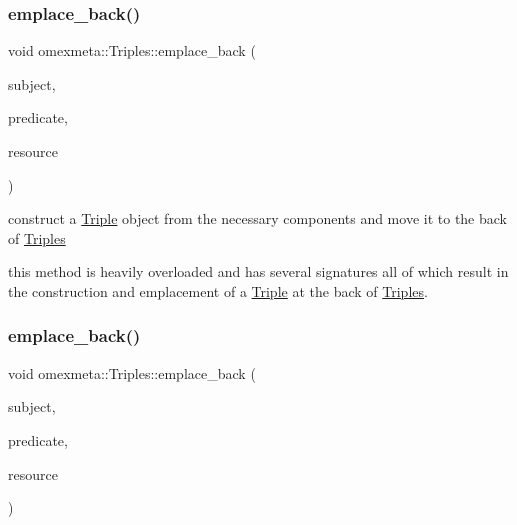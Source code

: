 \subsubsection{\texorpdfstring{emplace\+\_\+back()}{emplace\_back()}\hspace{0.1cm}{\footnotesize\ttfamily [4/7]}}
{\footnotesize\ttfamily void omexmeta\+::\+Triples\+::emplace\+\_\+back (\begin{DoxyParamCaption}\item[{\hyperlink{classomexmeta_1_1Subject}{Subject}}]{subject,  }\item[{\hyperlink{classomexmeta_1_1BiomodelsModelQualifier}{Biomodels\+Model\+Qualifier}}]{predicate,  }\item[{const \hyperlink{classomexmeta_1_1Resource}{Resource} \&}]{resource }\end{DoxyParamCaption})}



construct a \hyperlink{classomexmeta_1_1Triple}{Triple} object from the necessary components and move it to the back of \hyperlink{classomexmeta_1_1Triples}{Triples} 

this method is heavily overloaded and has several signatures all of which result in the construction and emplacement of a \hyperlink{classomexmeta_1_1Triple}{Triple} at the back of \hyperlink{classomexmeta_1_1Triples}{Triples}. \mbox{\label{classomexmeta_1_1Triples_a9f3f3152592f99ac95f65e0e7ce3b450}} 
\subsubsection{\texorpdfstring{emplace\+\_\+back()}{emplace\_back()}\hspace{0.1cm}{\footnotesize\ttfamily [5/7]}}
{\footnotesize\ttfamily void omexmeta\+::\+Triples\+::emplace\+\_\+back (\begin{DoxyParamCaption}\item[{\hyperlink{classomexmeta_1_1Subject}{Subject}}]{subject,  }\item[{\hyperlink{classomexmeta_1_1DCTerm}{D\+C\+Term}}]{predicate,  }\item[{const \hyperlink{classomexmeta_1_1Resource}{Resource} \&}]{resource }\end{DoxyParamCaption})}



